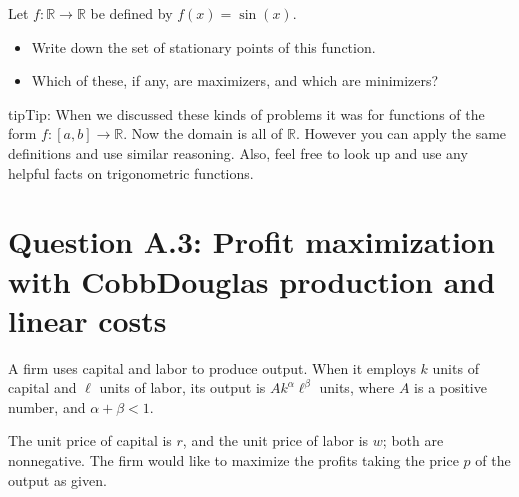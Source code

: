 \documentclass[letterpaper,10pt,english]{jupyterBook}
\begin{document}
\sphinxAtStartPar
{}

\sphinxAtStartPar
Let \(f \colon \mathbb{R} \to \mathbb{R}\) be defined by \(f(x) = \sin(x)\).
\begin{itemize}
\item {} 
\sphinxAtStartPar
Write down the set of stationary points of this function.

\item {} 
\sphinxAtStartPar
Which of these, if any, are maximizers, and which are minimizers?

\end{itemize}

\begin{sphinxadmonition}{tip}{Tip:}
\sphinxAtStartPar
When we discussed these kinds of problems it was for functions of the form \(f \colon [a, b] \to \mathbb{R}\).  Now the domain is all of \(\mathbb{R}\).
However you can apply the same definitions and use similar reasoning.  Also, feel free to look up and use any helpful facts on trigonometric functions.
\end{sphinxadmonition}


\section{Question A.3: Profit maximization with Cobb\sphinxhyphen{}Douglas production and linear costs}
\label{\detokenize{02.exercises:question-a-3-profit-maximization-with-cobb-douglas-production-and-linear-costs}}
\sphinxAtStartPar
A firm uses capital and labor to produce output.
When it employs \(k\) units of capital and \(\ell\) units of labor, its output is \(A k^{\alpha} \ell^{\beta}\) units, where \(A\) is a positive number, and \(\alpha + \beta < 1\).

\sphinxAtStartPar
The unit price of capital is \(r\), and the unit price of labor is \(w\); both are non\sphinxhyphen{}negative.
The firm would like to maximize the profits taking the price \(p\) of the output as given.
\end{document}
